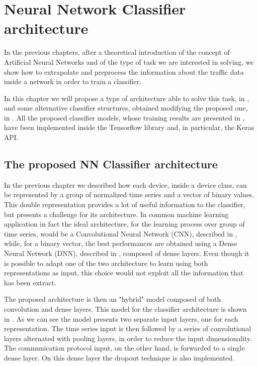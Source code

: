 \chapter{Neural Network Classifier architecture}\label{chap5}

In the previous chapters, after a theoretical introduction of the concept of Artificial Neural Networks and of the type of task we are interested in solving, we show how to extrapolate and preprocess the information about the traffic data inside a network in order to train a classifier.

In this chapter we will propose a type of architecture able to solve this task, in , and some  alternative classifier structures, obtained modifying the proposed one, in . All the proposed classifier models, whose training results are presented in , have been implemented inside the Tensorflow library\cite{tf} and, in particular, the Keras API\cite{keras}. 




\section{The proposed NN Classifier architecture}\label{modelprop}

In the previous chapter we described how each device, inside a device class, can be represented by a group of normalized time series and a vector of binary values. This double representation provides a lot of useful information to the classifier, but presents a challenge for its architecture. In common machine learning application in fact the ideal architecture, for the learning process over group of time series, would be a Convolutional Neural Network (CNN), described in , while, for a binary vector, the best performances are obtained using a Dense Neural Network (DNN), described in , composed of dense layers.
Even though it is possible to adapt one of the two architecture to learn using both representations as input, this choice would not exploit all the information that has been extract. 

The proposed architecture is then an "hybrid" model composed of both convolution and dense layers.
This model for the classifier architecture is shown in . As we can see the model presents two separate input layers, one for each representation. The time series input is then followed by a series of convolutional layers alternated with pooling layers, in order to reduce the input dimensionality. The communication protocol input, on the other hand, is forwarded to a single dense layer. On this dense layer the dropout technique is also implemented.

